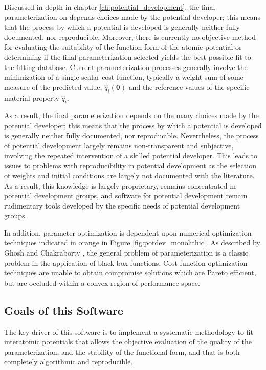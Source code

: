 Discussed in depth in chapter \ref{ch:potential_development}, the final parameterization on depends choices made by the potential developer; this means that the process by which a potential is developed is generally neither fully documented, nor reproducible.  Moreover, there is currently no objective method for evaluating the suitability of the function form of the atomic potential or determining if the final parameterization selected yields the best possible fit to the fitting database.  Current parameterization processes generally involve the minimization of a single scalar cost function, typically a weight sum of some measure of the predicted value, $\hat{q}_i(\bm{\theta})$ and the reference values of the specific material property $\hat{q}_i$.

As a result, the final parameterization depends on the many choices made by the potential developer; this means that the process by which a potential is developed is generally neither fully documented, nor reproducible.  Nevertheless, the process of potential development largely remains non-transparent and subjective,\cite{martinez2013_fitting,martinez2016_posmat} involving the repeated intervention of a skilled potential developer.\cite{brenner2000_fitting}
This leads to issues to problems with reproducibility in potential development as the selection of weights and initial conditions are largely not documented with the literature.  
As a result, this knowledge is largely proprietary, remains concentrated in potential development groups, and software for potential development remain rudimentary tools developed by the specific needs of potential development groups.

In addition, parameter optimization is dependent upon numerical optimization techniques indicated in orange in Figure \ref{fig:potdev_monolithic}.  As described by Ghosh and Chakraborty \cite{ghosh2014_potdev_pareto}, the general problem of parameterization is a classic problem in the application of black box functions.  Cost function optimization techniques are unable to obtain compromise solutions which are Pareto efficient, but are occluded within a convex region of performance space.  

\subsection{Goals of this Software}

The key driver of this software is to implement a systematic methodology to fit interatomic potentials that allows the objective evaluation of the quality of the parameterization, and the stability of the functional form, and that is both completely algorithmic and reproducible.  

